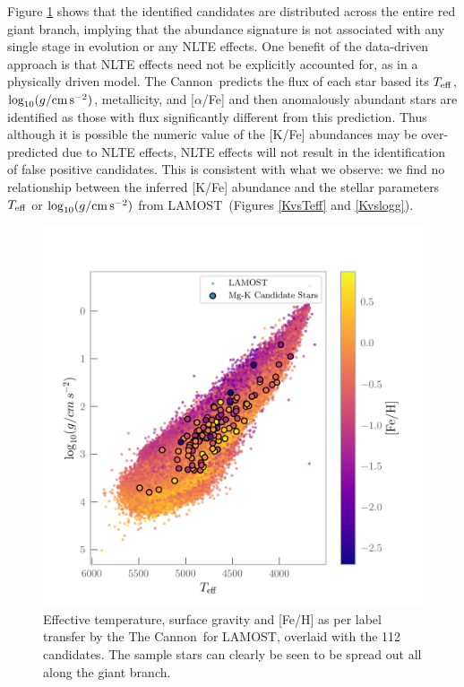 \documentclass[a4paper,fleqn,usenatbib]{mnras}
\newcommand{\project}[1]{#1}
\newcommand{\lamost}{\project{LAMOST}}
\newcommand{\tc}{\project{The Cannon}}
\newcommand{\teff}{T_{\rm eff}}
\newcommand{\logg}{\log_{10}(g/{\rm cm\,s}^{-2})}
\begin{document}
Figure \ref{loggTeffFeh} shows that the identified candidates are distributed across the entire red giant branch, implying that the abundance signature is not associated with any single stage in evolution or any NLTE effects. One benefit of the data-driven approach is that NLTE effects need not be explicitly accounted for, as in a physically driven model. \tc\ predicts the flux of each star based its $\teff$, $\logg$, metallicity, and [$\alpha$/Fe] and then anomalously abundant stars are identified as those with flux significantly different from this prediction. Thus although it is possible the numeric value of the [K/Fe] abundances may be over-predicted due to NLTE effects, NLTE effects will not result in the identification of false positive candidates. This is consistent with what we observe: we find no relationship between the inferred [K/Fe] abundance and the stellar parameters $\teff$ or $\logg$ from \lamost\ (Figures \ref{KvsTeff} and \ref{Kvslogg}).






\begin{figure}
	\includegraphics[width=\columnwidth]{loggTeffFeH.png}
    \caption{Effective temperature, surface gravity and [Fe/H] as per label transfer by the \tc\ for LAMOST, overlaid with the 112 candidates. The sample stars can clearly be seen to be spread out all along the giant branch.}
    \label{loggTeffFeh}
\end{figure}
\end{document}
